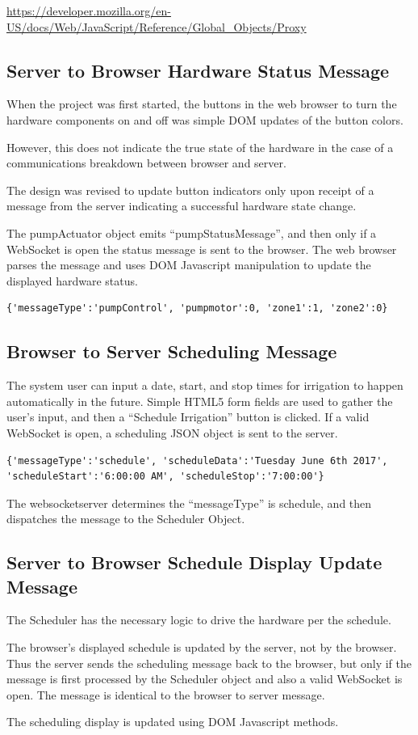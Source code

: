 \url{https://developer.mozilla.org/en-US/docs/Web/JavaScript/Reference/Global_Objects/Proxy}

\subsection{Server to Browser Hardware Status Message}

When the project was first started, the buttons in the web browser to turn the 
hardware components on and off was simple DOM updates of the button colors.

However, this does not indicate the true state of the hardware in the case of a 
communications breakdown between browser and server.

The design was revised to update button indicators only upon receipt of a 
message from the server indicating a successful hardware state change.

The pumpActuator object emits ``pumpStatusMessage'', and then only if a 
WebSocket is open the status message is sent to the browser.  The web browser 
parses the message and uses DOM Javascript manipulation to update the displayed 
hardware status.

\begin{verbatim}
{'messageType':'pumpControl', 'pumpmotor':0, 'zone1':1, 'zone2':0}
\end{verbatim}

\subsection{Browser to Server Scheduling Message}

The system user can input a date, start, and stop times for irrigation to 
happen automatically in the future.  Simple HTML5 form fields are used to 
gather the user's input, and then a ``Schedule Irrigation'' button is clicked.  
If a valid WebSocket is open, a scheduling JSON object is sent to the server.

\begin{verbatim}
{'messageType':'schedule', 'scheduleData':'Tuesday June 6th 2017',
'scheduleStart':'6:00:00 AM', 'scheduleStop':'7:00:00'}
\end{verbatim}

The websocketserver determines the ``messageType'' is schedule, and then 
dispatches the message to the Scheduler Object.  

\subsection{Server to Browser Schedule Display Update Message}

The Scheduler has the necessary logic to drive the hardware per the schedule.

The browser's displayed schedule is updated by the server, not by the browser.  
Thus the server sends the scheduling message back to the browser, but only if 
the message is first processed by the Scheduler object and also a valid 
WebSocket is open.  The message is identical to the browser to server message.

The scheduling display is updated using DOM Javascript methods.